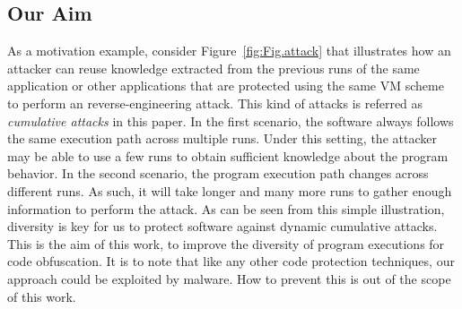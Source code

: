 \subsection{Our Aim}
As a motivation example, consider Figure~\ref{fig:Fig.attack} that illustrates how an attacker
can reuse knowledge extracted from the previous runs of the same application or
other applications that are protected using the same VM scheme to perform an reverse-engineering attack.
This kind of attacks is referred as \emph{cumulative attacks} in this paper.
In the first scenario, the software always follows the same execution path
across multiple runs. Under this setting, the attacker may be able to use a few runs to
obtain sufficient knowledge about the program behavior.
In the second scenario, the program execution path changes across different runs.
As such, it will take longer and many more runs to gather enough information to perform the attack.
As can be seen from this simple illustration, diversity is key for us to protect software against dynamic cumulative attacks.
This is the aim of this work, to improve the diversity of program executions for code obfuscation.
It is to note that like any other code protection techniques, our approach could be exploited by malware.
How to prevent this is out of the scope of this work.
